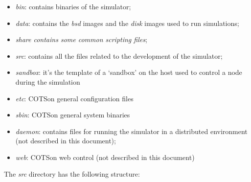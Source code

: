 \documentclass[a4paper]{article}
\begin{document}
\begin{itemize}
\item {
\textit{bin}: contains binaries of the simulator;}
\item {
\textit{data}: contains the \textit{bsd} images and the \textit{disk}
images used to run simulations;}
\item {
\textit{share contains some common scripting files};}
\item {
\textit{src}: contains all the files related to the development of the
simulator;}
\item {
\textit{sandbox}: it{\textquoteright}s the template of a
{\textquoteleft}sandbox{\textquoteright} on the host used to control a
node during the simulation}
\item {
\textit{etc}: COTSon general configuration files}
\item {
\textit{sbin}: COTSon general system binaries}
\item {
\textit{daemon}: contains files for running the simulator in a
distributed environment (not described in this document);}
\item {
\textit{web}: COTSon web control (not described in this document)}
\end{itemize}
{
The \textit{src} directory has the following structure:}
\end{document}
